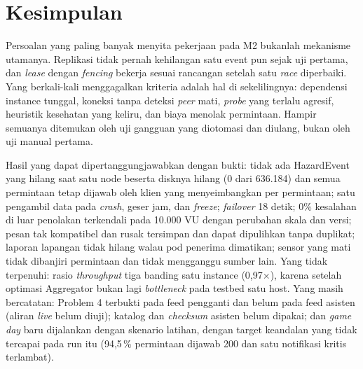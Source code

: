 \documentclass{fairmeta}
\newcommand{\en}[1]{\textit{#1}}
\begin{document}
\section{Kesimpulan}

Persoalan yang paling banyak menyita pekerjaan pada M2 bukanlah mekanisme utamanya. Replikasi tidak pernah kehilangan satu event pun sejak uji pertama, dan \en{lease} dengan \en{fencing} bekerja sesuai rancangan setelah satu \en{race} diperbaiki. Yang berkali-kali menggagalkan kriteria adalah hal di sekelilingnya: dependensi instance tunggal, koneksi tanpa deteksi \en{peer} mati, \en{probe} yang terlalu agresif, heuristik kesehatan yang keliru, dan biaya menolak permintaan. Hampir semuanya ditemukan oleh uji gangguan yang diotomasi dan diulang, bukan oleh uji manual pertama.

Hasil yang dapat dipertanggungjawabkan dengan bukti: tidak ada HazardEvent yang hilang saat satu node beserta disknya hilang (0 dari 636.184) dan semua permintaan tetap dijawab oleh klien yang menyeimbangkan per permintaan; satu pengambil data pada \en{crash}, geser jam, dan \en{freeze}; \en{failover} 18 detik; 0\% kesalahan di luar penolakan terkendali pada 10.000 VU dengan perubahan skala dan versi; pesan tak kompatibel dan rusak tersimpan dan dapat dipulihkan tanpa duplikat; laporan lapangan tidak hilang walau pod penerima dimatikan; sensor yang mati tidak dibanjiri permintaan dan tidak mengganggu sumber lain. Yang tidak terpenuhi: rasio \en{throughput} tiga banding satu instance (0,97$\times$), karena setelah optimasi Aggregator bukan lagi \en{bottleneck} pada testbed satu host. Yang masih bercatatan: Problem 4 terbukti pada feed pengganti dan belum pada feed asisten (aliran \en{live} belum diuji); katalog dan \en{checksum} asisten belum dipakai; dan \en{game day} baru dijalankan dengan skenario latihan, dengan target keandalan yang tidak tercapai pada run itu (94,5\,\% permintaan dijawab 200 dan satu notifikasi kritis terlambat).
\end{document}
